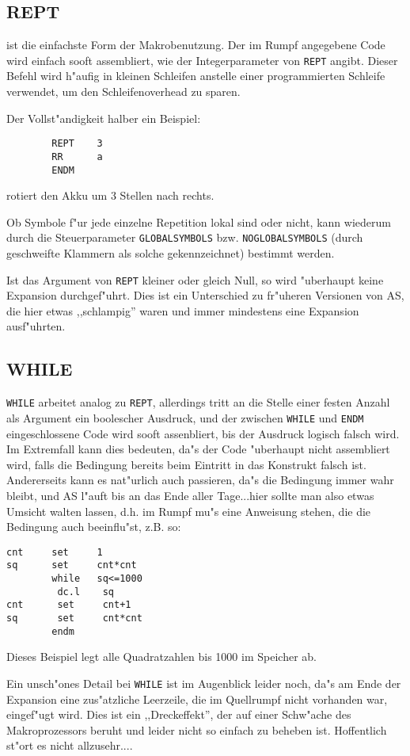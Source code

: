 \documentclass[12pt,a4paper,twoside]{report}
\makeatletter
\newcommand{\tty}[1]{{\tt #1}}
\newcommand{\ttindex}[1]{\index{#1@{\tt #1}}}
\makeatother
\begin{document}

\subsection{REPT}
\ttindex{REPT}

ist die einfachste Form der Makrobenutzung.  Der im Rumpf angegebene
Code wird einfach sooft assembliert, wie der Integerparameter von
\tty{REPT} angibt.  Dieser Befehl wird h"aufig in kleinen Schleifen anstelle
einer programmierten Schleife verwendet, um den Schleifenoverhead zu
sparen.
\par
Der Vollst"andigkeit halber ein Beispiel:
\begin{verbatim}
        REPT    3
        RR      a
        ENDM
\end{verbatim}
rotiert den Akku um 3 Stellen nach rechts.
\par
Ob Symbole f"ur jede einzelne Repetition lokal sind oder nicht,
kann wiederum durch die Steuerparameter \tty{GLOBALSYMBOLS} bzw.
\tty{NOGLOBALSYMBOLS} (durch geschweifte Klammern als solche
gekennzeichnet) bestimmt werden.

Ist das Argument von \tty{REPT} kleiner oder gleich Null, so wird
"uberhaupt keine Expansion durchgef"uhrt.  Dies ist ein Unterschied
zu fr"uheren Versionen von AS, die hier etwas ,,schlampig'' waren
und immer mindestens eine Expansion ausf"uhrten.


\subsection{WHILE}
\ttindex{WHILE}

\tty{WHILE} arbeitet analog zu \tty{REPT}, allerdings tritt an die
Stelle einer festen Anzahl als Argument ein boolescher Ausdruck, und
der zwischen \tty{WHILE} und \tty{ENDM} eingeschlossene Code wird sooft
assenbliert, bis der Ausdruck logisch falsch wird.  Im Extremfall kann
dies bedeuten, da"s der Code "uberhaupt nicht assembliert wird, falls die
Bedingung bereits beim Eintritt in das Konstrukt falsch ist.  Andererseits
kann es nat"urlich auch passieren, da"s die Bedingung immer wahr bleibt,
und AS l"auft bis an das Ende aller Tage...hier sollte man also etwas
Umsicht walten lassen, d.h. im Rumpf mu"s eine Anweisung stehen, die die
Bedingung auch beeinflu"st, z.B. so:
\begin{verbatim}
cnt     set     1
sq      set     cnt*cnt
        while   sq<=1000
         dc.l    sq
cnt      set     cnt+1
sq       set     cnt*cnt
        endm
\end{verbatim}
Dieses Beispiel legt alle Quadratzahlen bis 1000 im Speicher ab.
\par
Ein unsch"ones Detail bei \tty{WHILE} ist im Augenblick leider noch,
da"s am Ende der Expansion eine zus"atzliche Leerzeile, die im Quellrumpf
nicht vorhanden war, eingef"ugt wird.  Dies ist ein ,,Dreckeffekt'',
der auf einer Schw"ache des Makroprozessors beruht und leider nicht so
einfach zu beheben ist.  Hoffentlich st"ort es nicht allzusehr....
\end{document}

